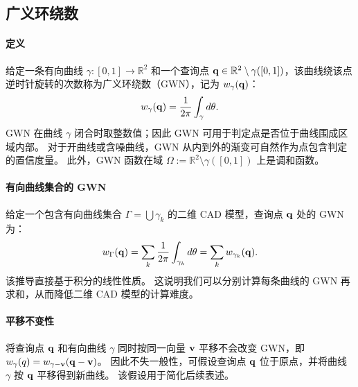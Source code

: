 \subsection{广义环绕数}\label{sec:qry-winding}
\paragraph{定义}
给定一条有向曲线 $\gamma : [0, 1] \to \mathbb{R}^2$ 和一个查询点 $\mathbf{q} \in \mathbb{R}^2 \setminus \gamma([0, 1])$，该曲线绕该点逆时针旋转的次数称为广义环绕数（GWN），记为 $w_{\gamma}(\mathbf{q})$：
\begin{equation}
w_{\gamma}(\mathbf{q}) = \frac{1}{2\pi} \int_\gamma d\theta.
\end{equation}
GWN 在曲线 $\gamma$ 闭合时取整数值；因此 GWN 可用于判定点是否位于曲线围成区域内部。
对于开曲线或含噪曲线，GWN 从内到外的渐变可自然作为点包含判定的置信度量。
%
此外，GWN 函数在域 $\Omega:=\mathbb{R}^2\setminus \gamma([0,1])$ 上是调和函数。

\paragraph{有向曲线集合的 GWN}
给定一个包含有向曲线集合 $\Gamma = \bigcup \gamma_k$ 的二维 CAD 模型，查询点 $\mathbf{q}$ 处的 GWN 为：
\begin{equation}
w_{\Gamma}(\mathbf{q}) = \sum_k \frac{1}{2\pi} \int_{\gamma_k} d\theta = \sum_k w_{\gamma_k}(\mathbf{q}).
\end{equation}
该推导直接基于积分的线性性质。
%
这说明我们可以分别计算每条曲线的 GWN 再求和，从而降低二维 CAD 模型的计算难度。

\paragraph{平移不变性}
将查询点 $\mathbf{q}$ 和有向曲线 $\gamma$ 同时按同一向量 $\mathbf{v}$ 平移不会改变 GWN，即 $w_\gamma(q) = w_{\gamma-\mathbf{v}}(\mathbf{q}-\mathbf{v})$。
%
因此不失一般性，可假设查询点 $\mathbf{q}$ 位于原点，并将曲线 $\gamma$ 按 $\mathbf{q}$ 平移得到新曲线。
%
该假设用于简化后续表述。


